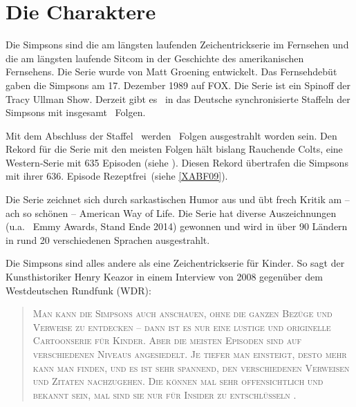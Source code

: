 \chapter{Die Charaktere}\label{Charaktere}

Die Simpsons sind die am längsten laufenden Zeichentrickserie im Fernsehen und die am längsten laufende Sitcom in der Geschichte des amerikanischen Fernsehens. Die Serie wurde von Matt Groening entwickelt. Das Fernsehdebüt gaben die Simpsons am 17. Dezember 1989 auf FOX. Die Serie ist ein Spinoff der \glqq Tracy Ullman Show\grqq . Derzeit gibt es \staffelAnzahl\ in das Deutsche synchronisierte Staffeln der Simpsons mit insgesamt \episodenAnzahl\ Folgen.

Mit dem Abschluss der Staffel \staffelAnzahl\ werden \episodenAnzahl\ Folgen ausgestrahlt worden sein. Den Rekord für die Serie mit den meisten Folgen hält bislang \glqq Rauchende Colts\grqq , eine Western-Serie mit 635 Episoden (siehe \cite{Serienrekord}). Diesen Rekord übertrafen die Simpsons mit ihrer 636. Episode \glqq Rezeptfrei\grqq\ (siehe \ref{XABF09}).

Die Serie zeichnet sich durch sarkastischen Humor aus und übt frech Kritik am -- ach so schönen -- \glqq American Way of Life\grqq . Die Serie hat diverse Auszeichnungen (u.a. \emmyAnzahl\ Emmy Awards, Stand Ende 2014) gewonnen und wird in über 90 Ländern in rund 20 verschiedenen Sprachen ausgestrahlt.

Die Simpsons sind alles andere als eine Zeichentrickserie für Kinder. So sagt der Kunsthistoriker Henry Keazor in einem Interview von 2008 gegenüber dem Westdeutschen Rundfunk (WDR):
\begin{quotation}
\scshape
\glqq Man kann die Simpsons auch anschauen, ohne die ganzen Be\-zü\-ge und Verweise zu entdecken -- dann ist es nur eine lustige und originelle Cartoonserie für Kinder. Aber die meisten Episoden sind auf verschiedenen Niveaus angesiedelt. Je tiefer man einsteigt, desto mehr kann man finden, und es ist sehr spannend, den verschiedenen Verweisen und Zitaten nachzugehen. Die können mal sehr offensichtlich und bekannt sein, mal sind sie nur für Insider zu entschlüsseln \cite{HenryKeazor}\grqq .
\end{quotation}

